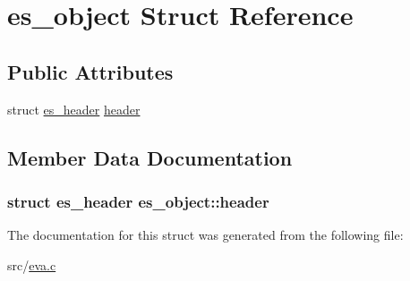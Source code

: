 \hypertarget{structes__object}{\section{es\-\_\-object Struct Reference}
\label{structes__object}
}
\subsection*{Public Attributes}
\begin{DoxyCompactItemize}
\item 
struct \hyperlink{structes__header}{es\-\_\-header} \hyperlink{structes__object_a0a055fbc2638b28903af0dc3e5dcae2d}{header}
\end{DoxyCompactItemize}


\subsection{Member Data Documentation}
\hypertarget{structes__object_a0a055fbc2638b28903af0dc3e5dcae2d}{
\subsubsection[{header}]{\setlength{\rightskip}{0pt plus 5cm}struct {\bf es\-\_\-header} es\-\_\-object\-::header}}\label{structes__object_a0a055fbc2638b28903af0dc3e5dcae2d}


The documentation for this struct was generated from the following file\-:\begin{DoxyCompactItemize}
\item 
src/\hyperlink{eva_8c}{eva.\-c}\end{DoxyCompactItemize}

